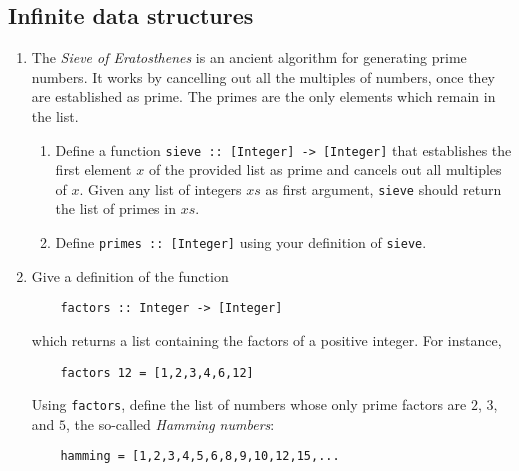 \documentclass{article}
\def\code#1{\texttt{#1}}
\begin{document}
\subsection{Infinite data structures}
\begin{enumerate}
    \item \cite[p. 443]{thompson} The \textit{Sieve of Eratosthenes} is an ancient algorithm for generating prime numbers. It works by cancelling out all the multiples of numbers, once they are established as prime. The primes are the only elements which remain in the list.
    \begin{enumerate}
        \item Define a function \code{sieve :: [Integer] -> [Integer]} that establishes the first element $x$ of the provided list as prime and cancels out all multiples of $x$. Given any list of integers $xs$ as first argument, \code{sieve} should return the list of primes in $xs$.
        \item Define \code{primes :: [Integer]} using your definition of \code{sieve}.
    \end{enumerate}

    \item \cite[p. 447]{thompson} Give a definition of the function
        \begin{verbatim}
    factors :: Integer -> [Integer]
        \end{verbatim}
        which returns a list containing the factors of a positive integer. For instance,
        \begin{verbatim}
    factors 12 = [1,2,3,4,6,12]
        \end{verbatim}
        Using \code{factors}, define the list of numbers whose only prime factors are $2$, $3$, and $5$, the so-called \textit{Hamming numbers}:
        \begin{verbatim}
    hamming = [1,2,3,4,5,6,8,9,10,12,15,...
        \end{verbatim}
\end{enumerate}

\printbibliography
\end{document}
